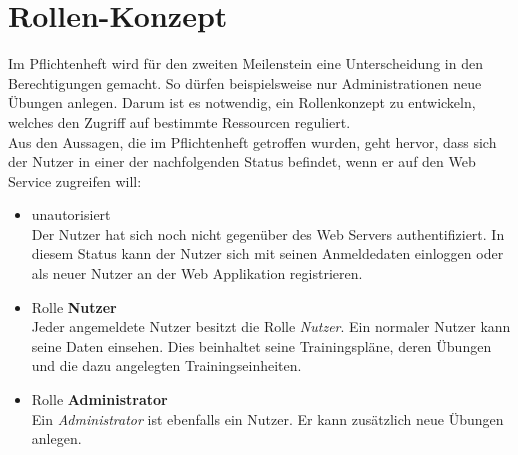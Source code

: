 \section{Rollen-Konzept}
\label{sec:rollen-konzept}
Im Pflichtenheft wird für den zweiten Meilenstein eine Unterscheidung in den Berechtigungen gemacht. So dürfen beispielsweise nur Administrationen neue Übungen anlegen. Darum ist es notwendig, ein Rollenkonzept zu entwickeln, welches den Zugriff auf bestimmte Ressourcen reguliert. \\
Aus den Aussagen, die im Pflichtenheft getroffen wurden, geht hervor, dass sich der Nutzer in einer der nachfolgenden Status befindet, wenn er auf den Web Service zugreifen will: 
\begin{itemize}
\item unautorisiert \\
Der Nutzer hat sich noch nicht gegenüber des Web Servers authentifiziert. In diesem Status kann der Nutzer sich mit seinen Anmeldedaten einloggen oder als neuer Nutzer an der Web Applikation registrieren.
\item Rolle \textbf{Nutzer}\\
Jeder angemeldete Nutzer besitzt die Rolle \textit{Nutzer}. Ein normaler Nutzer kann seine Daten einsehen. Dies beinhaltet seine Trainingspläne, deren Übungen und die dazu angelegten Trainingseinheiten.
\item Rolle \textbf{Administrator}\\
Ein \textit{Administrator} ist ebenfalls ein Nutzer. Er kann zusätzlich neue Übungen anlegen. 
\end{itemize}